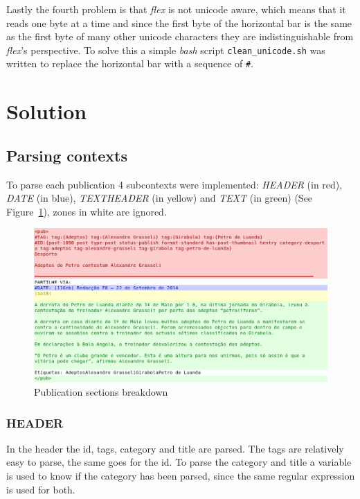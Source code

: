 \documentclass[a4paper]{article}
\begin{document}
Lastly the fourth problem is that \textit{flex} is not unicode aware,
which means that it reads one byte at a time and since the first byte of the
horizontal bar is the same as the first byte of many other unicode characters
they are indistinguishable from \textit{flex}'s perspective. To solve this a
simple \textit{bash} script \texttt{clean\_unicode.sh} was written to replace
the horizontal bar with a sequence of \texttt{\#}.

\section{Solution}

\subsection{Parsing contexts}

To parse each publication 4 subcontexts were implemented: \textit{HEADER} (in
red), \textit{DATE} (in blue), \textit{TEXTHEADER} (in yellow) and
\textit{TEXT} (in green) (See Figure~\ref{fig:example_pub_colored}), zones in
white are ignored.

\begin{figure}[H]
    \includegraphics[width=\textwidth]{./example_pub_colored.png}
    \caption{Publication sections breakdown}\label{fig:example_pub_colored}
\end{figure}

\subsubsection{HEADER}

In the header the id, tags, category and title are parsed. The tags are
relatively easy to parse, the same goes for the id. To parse the category and
title a variable is used to know if the category has been parsed, since the
same regular expression is used for both.
\end{document}
